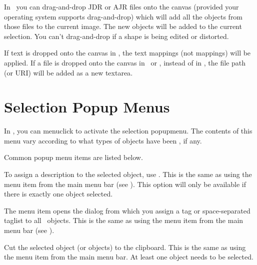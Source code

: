 In \selectmode\ you can \gls{drag-and-drop} \gls{JDR} or \gls{AJR}
files onto the \gls{canvas} (provided your operating system supports
\gls*{drag-and-drop}) which will add all the objects from those files to
the current image. The new objects will be added to the current
selection. You can't \gls*{drag-and-drop} if a shape is being edited or
distorted.

If text is dropped onto the \gls{canvas} in \selectmode, the text
mappings (not  mappings) will be applied. If a file is
dropped onto the \gls{canvas} in \textmode\ or \mathsmode, instead of
in \selectmode, the file path (or URI) will be added as a new \gls{textarea}.

\section{Selection Popup Menus}
\label{sec:selectpopups}

In \selectmode, you can \gls{menuclick} to activate the
selection \gls{popupmenu}. The contents of this menu vary according to
what types of \glspl*{object} have been \selected, if any.



Common popup menu items are listed below.


To assign a description to the selected \gls{object}, use
. This is the same as using the
 menu item from the main menu bar
(see ).
This option will only be available if there is exactly one
\gls{object} selected.


The  menu item opens the 
dialog from which you assign a tag or space-separated \gls{taglist} to all
\selected\ objects. This is the same as using the 
 menu item from the main menu bar (see ).


Cut the selected \gls{object} (or \glspl{object}) to the clipboard.
This is the same as using the  menu item from the
main menu bar. At least one \gls{object} needs to be selected.



